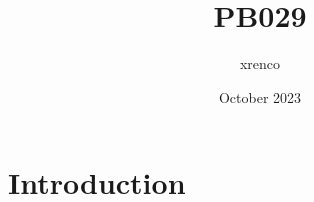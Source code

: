 \documentclass{article}
\title{PB029}
\author{xrenco }
\date{October 2023}
\begin{document}
\maketitle

\section{Introduction}
\end{document}
